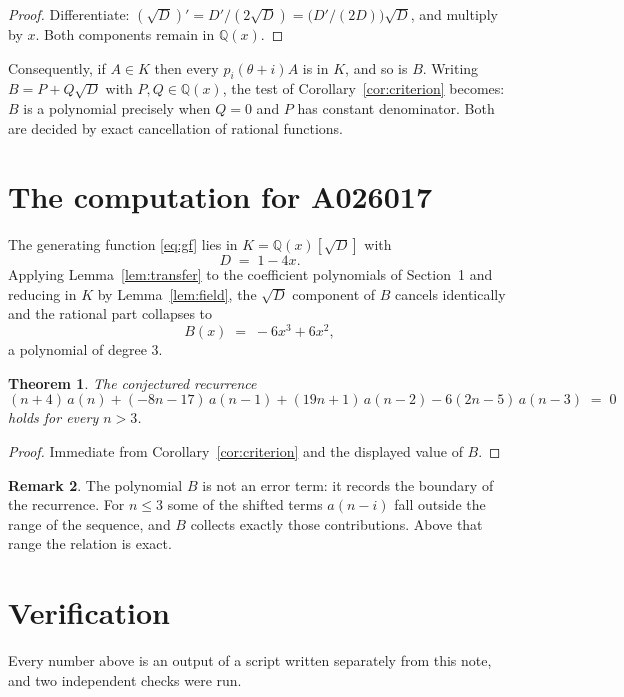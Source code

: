\documentclass[11pt,a4paper]{article}
\theoremstyle{plain}
\newtheorem{theorem}{Theorem}
\theoremstyle{definition}
\newtheorem{remark}[theorem]{Remark}
\begin{document}
\begin{proof}
Differentiate: $(\sqrt{D})'=D'/(2\sqrt{D})=\bigl(D'/(2D)\bigr)\sqrt{D}$, and multiply by
$x$. Both components remain in $\mathbb{Q}(x)$.
\end{proof}

Consequently, if $A\in K$ then every $p_{i}(\theta+i)A$ is in $K$, and so is $B$. Writing
$B=P+Q\sqrt{D}$ with $P,Q\in\mathbb{Q}(x)$, the test of Corollary~\ref{cor:criterion}
becomes: $B$ is a polynomial precisely when $Q=0$ and $P$ has constant denominator. Both
are decided by exact cancellation of rational functions.

\section{The computation for A026017}

The generating function \eqref{eq:gf} lies in $K=\mathbb{Q}(x)[\sqrt{D}]$ with
\[
D \;=\; 1 - 4 x .
\]
Applying Lemma~\ref{lem:transfer} to the coefficient polynomials of Section~1 and reducing
in $K$ by Lemma~\ref{lem:field}, the $\sqrt{D}$ component of $B$ cancels identically and
the rational part collapses to
\[
B(x)\;=\;- 6 x^{3} + 6 x^{2} ,
\]
a polynomial of degree $3$.

\begin{theorem}
The conjectured recurrence
\[
(n + 4)\,a(n) + (- 8 n - 17)\,a(n-1) + (19 n + 1)\,a(n-2) -  6 \left(2 n - 5\right)\,a(n-3) \;=\;0
\]
holds for every $n>3$.
\end{theorem}

\begin{proof}
Immediate from Corollary~\ref{cor:criterion} and the displayed value of $B$.
\end{proof}

\begin{remark}
The polynomial $B$ is not an error term: it records the boundary of the recurrence. For
$n\le3$ some of the shifted terms $a(n-i)$ fall outside the range of the sequence,
and $B$ collects exactly those contributions. Above that range the relation is exact.
\end{remark}

\section{Verification}

Every number above is an output of a script written separately from this note, and two
independent checks were run.
\end{document}
